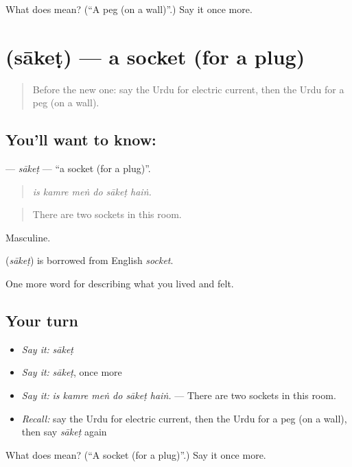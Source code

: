 \begin{tcolorbox}[breakable,colback=teal!4,colframe=teal!35!black,title={Before you move on}]
What does  mean? (\textquotedblleft{}A peg (on a wall)\textquotedblright{}.) Say it once more.
\end{tcolorbox}
\section[\texorpdfstring{\ur{ساکٹ} (sākeṭ)}{ساکٹ (sākeṭ)}]{ (sākeṭ) — a socket (for a plug)}

\label{lesson:UR-C504-saket}



\begin{quote}
Before the new one: say the Urdu for electric current, then the Urdu for a peg (on a wall).
\end{quote}

\subsection*{You'll want to know: }
\textbf{} — \emph{sākeṭ} — \textquotedblleft{}a socket (for a plug)\textquotedblright{}.

\begin{quote}
     
\end{quote}

\begin{quote}
\emph{is kamre meṅ do sākeṭ haiṅ.}
\end{quote}

\begin{quote}
There are two sockets in this room.
\end{quote}

Masculine.

\begin{cousinweb}
\textbf{} (\emph{sākeṭ}) is borrowed from English \emph{socket}.
\end{cousinweb}

\begin{grammarlens}[title={What you've built}]
One more word for describing what you lived and felt.
\end{grammarlens}

\subsection*{Your turn}
\begin{itemize}
\raggedright
  \item \emph{Say it:} \emph{sākeṭ}
  \item \emph{Say it:} \emph{sākeṭ}, once more
  \item \emph{Say it:} \emph{is kamre meṅ do sākeṭ haiṅ.} — There are two sockets in this room.
  \item \emph{Recall:} say the Urdu for electric current, then the Urdu for a peg (on a wall), then say \emph{sākeṭ} again
\end{itemize}

\begin{tcolorbox}[breakable,colback=teal!4,colframe=teal!35!black,title={Before you move on}]
What does  mean? (\textquotedblleft{}A socket (for a plug)\textquotedblright{}.) Say it once more.
\end{tcolorbox}
